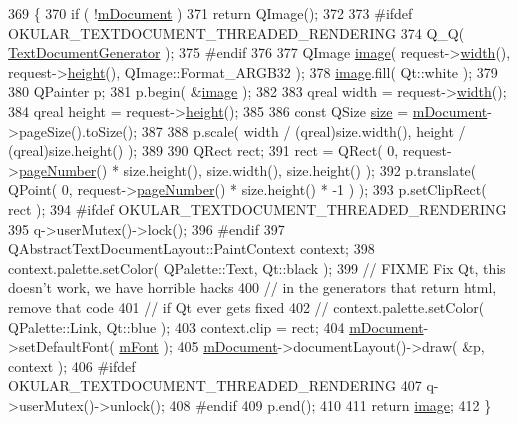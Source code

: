 \begin{DoxyCode}
369 \{
370     \textcolor{keywordflow}{if} ( !\hyperlink{classOkular_1_1TextDocumentGeneratorPrivate_abee33b8837b86732e286172de83e110e}{mDocument} )
371         \textcolor{keywordflow}{return} QImage();
372 
373 \textcolor{preprocessor}{#ifdef OKULAR\_TEXTDOCUMENT\_THREADED\_RENDERING}
374     Q\_Q( \hyperlink{classOkular_1_1TextDocumentGenerator}{TextDocumentGenerator} );
375 \textcolor{preprocessor}{#endif}
376 
377     QImage \hyperlink{classOkular_1_1TextDocumentGeneratorPrivate_a6245b449cf861a0841a38377205fbd8c}{image}( request->\hyperlink{classOkular_1_1PixmapRequest_a3e82f09b91a52efed7435eeb9903e5fc}{width}(), request->\hyperlink{classOkular_1_1PixmapRequest_a782392a2efc6303994c7e0158c76ee06}{height}(), QImage::Format\_ARGB32 );
378     \hyperlink{classOkular_1_1TextDocumentGeneratorPrivate_a6245b449cf861a0841a38377205fbd8c}{image}.fill( Qt::white );
379 
380     QPainter p;
381     p.begin( &\hyperlink{classOkular_1_1TextDocumentGeneratorPrivate_a6245b449cf861a0841a38377205fbd8c}{image} );
382 
383     qreal width = request->\hyperlink{classOkular_1_1PixmapRequest_a3e82f09b91a52efed7435eeb9903e5fc}{width}();
384     qreal height = request->\hyperlink{classOkular_1_1PixmapRequest_a782392a2efc6303994c7e0158c76ee06}{height}();
385 
386     \textcolor{keyword}{const} QSize \hyperlink{synctex__parser_8c_aa23c661441688350614bd6a350d2b6ff}{size} = \hyperlink{classOkular_1_1TextDocumentGeneratorPrivate_abee33b8837b86732e286172de83e110e}{mDocument}->pageSize().toSize();
387 
388     p.scale( width / (qreal)size.width(), height / (qreal)size.height() );
389 
390     QRect rect;
391     rect = QRect( 0, request->\hyperlink{classOkular_1_1PixmapRequest_a50f959175182137dbb9e2dbd6ddd71aa}{pageNumber}() * size.height(), size.width(), size.height() );
392     p.translate( QPoint( 0, request->\hyperlink{classOkular_1_1PixmapRequest_a50f959175182137dbb9e2dbd6ddd71aa}{pageNumber}() * size.height() * -1 ) );
393     p.setClipRect( rect );
394 \textcolor{preprocessor}{#ifdef OKULAR\_TEXTDOCUMENT\_THREADED\_RENDERING}
395     q->userMutex()->lock();
396 \textcolor{preprocessor}{#endif}
397     QAbstractTextDocumentLayout::PaintContext context;
398     context.palette.setColor( QPalette::Text, Qt::black );
399 \textcolor{comment}{//  FIXME Fix Qt, this doesn't work, we have horrible hacks}
400 \textcolor{comment}{//        in the generators that return html, remove that code}
401 \textcolor{comment}{//        if Qt ever gets fixed}
402 \textcolor{comment}{//     context.palette.setColor( QPalette::Link, Qt::blue );}
403     context.clip = rect;
404     \hyperlink{classOkular_1_1TextDocumentGeneratorPrivate_abee33b8837b86732e286172de83e110e}{mDocument}->setDefaultFont( \hyperlink{classOkular_1_1TextDocumentGeneratorPrivate_a33bafae112835888fdcce49189d66b52}{mFont} );
405     \hyperlink{classOkular_1_1TextDocumentGeneratorPrivate_abee33b8837b86732e286172de83e110e}{mDocument}->documentLayout()->draw( &p, context );
406 \textcolor{preprocessor}{#ifdef OKULAR\_TEXTDOCUMENT\_THREADED\_RENDERING}
407     q->userMutex()->unlock();
408 \textcolor{preprocessor}{#endif}
409     p.end();
410 
411     \textcolor{keywordflow}{return} \hyperlink{classOkular_1_1TextDocumentGeneratorPrivate_a6245b449cf861a0841a38377205fbd8c}{image};
412 \}
\end{DoxyCode}

